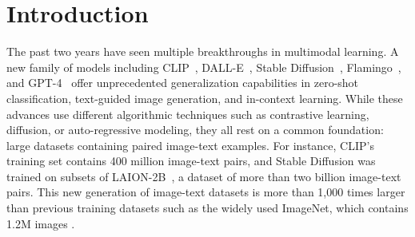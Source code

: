 \documentclass[dvipsnames,11pt]{article}
\begin{document}
\section{Introduction}
\label{sec:introduction}

The past two years have seen multiple breakthroughs in multimodal learning.
A new family of models including  CLIP~\citep{radford2021learning}, DALL-E~\citep{ramesh2021zero,ramesh2022hierarchical}, Stable Diffusion~\citep{rombach2022high}, Flamingo~\citep{alayrac2022flamingo}, and GPT-4~\citep{gpt4} offer unprecedented generalization capabilities in zero-shot classification, text-guided image generation, and in-context learning.
While these advances use different algorithmic techniques such as contrastive learning, diffusion, or auto-regressive modeling, they all rest on a common foundation: large datasets containing paired image-text examples.
For instance, CLIP’s training set contains 400 million image-text pairs, and Stable Diffusion was trained on subsets of LAION-2B~\citep{laion5b}, a dataset of more than two billion image-text pairs.
This new generation of image-text datasets is more than 1,000 times larger than previous training datasets such as the widely used ImageNet, which contains 1.2M images \citep{deng2009imagenet,ILSVRC15}.
\end{document}
